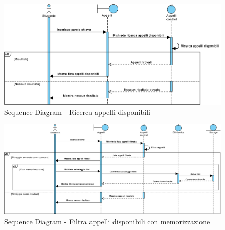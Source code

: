 \begin{figure}
	\centering
	\includegraphics[width=6.5in]{imgs/gruppo1/sequence_diagrams/SD8_ricerca_appelli_disponibili.pdf}
	\caption{Sequence Diagram - Ricerca appelli disponibili}
	\label{diag:ricercaAppelliDisponibiliSD}
\end{figure}
\newpage

\begin{figure}
	\centering
	\includegraphics[width=6.5in]{imgs/gruppo1/sequence_diagrams/SD9_filtra_appelli_disponibili_con_memorizzazione.pdf}
	\caption{Sequence Diagram - Filtra appelli disponibili con memorizzazione}
	\label{diag:filtraAppelliDisponibiliConMemSD}
\end{figure}

